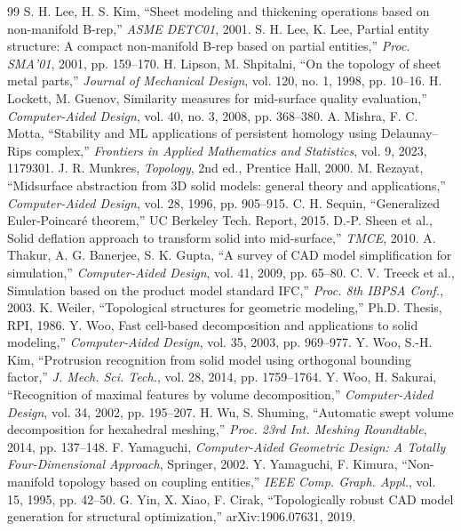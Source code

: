 \documentclass[conference]{IEEEtran}
\begin{document}
\begin{thebibliography}{99}
 S. H. Lee, H. S. Kim, ``Sheet modeling and thickening operations based on non-manifold B-rep,'' \textit{ASME DETC01}, 2001.  S. H. Lee, K. Lee, Partial entity structure: A compact non-manifold B-rep based on partial entities,'' \textit{Proc. SMA'01}, 2001, pp. 159–170.
 H. Lipson, M. Shpitalni, ``On the topology of sheet metal parts,'' \textit{Journal of Mechanical Design}, vol. 120, no. 1, 1998, pp. 10–16.  H. Lockett, M. Guenov, Similarity measures for mid-surface quality evaluation,'' \textit{Computer-Aided Design}, vol. 40, no. 3, 2008, pp. 368–380.
 A. Mishra, F. C. Motta, ``Stability and ML applications of persistent homology using Delaunay–Rips complex,'' \textit{Frontiers in Applied Mathematics and Statistics}, vol. 9, 2023, 1179301.  J. R. Munkres, \textit{Topology}, 2nd ed., Prentice Hall, 2000.  M. Rezayat, ``Midsurface abstraction from 3D solid models: general theory and applications,'' \textit{Computer-Aided Design}, vol. 28, 1996, pp. 905–915.
 C. H. Sequin, ``Generalized Euler-Poincaré theorem,'' UC Berkeley Tech. Report, 2015.  D.-P. Sheen et al., Solid deflation approach to transform solid into mid-surface,'' \textit{TMCE}, 2010.
 A. Thakur, A. G. Banerjee, S. K. Gupta, ``A survey of CAD model simplification for simulation,'' \textit{Computer-Aided Design}, vol. 41, 2009, pp. 65–80.  C. V. Treeck et al., Simulation based on the product model standard IFC,'' \textit{Proc. 8th IBPSA Conf.}, 2003.
 K. Weiler, ``Topological structures for geometric modeling,'' Ph.D. Thesis, RPI, 1986.  Y. Woo, Fast cell-based decomposition and applications to solid modeling,'' \textit{Computer-Aided Design}, vol. 35, 2003, pp. 969–977.
 Y. Woo, S.-H. Kim, ``Protrusion recognition from solid model using orthogonal bounding factor,'' \textit{J. Mech. Sci. Tech.}, vol. 28, 2014, pp. 1759–1764.  Y. Woo, H. Sakurai, ``Recognition of maximal features by volume decomposition,'' \textit{Computer-Aided Design}, vol. 34, 2002, pp. 195–207.
 H. Wu, S. Shuming, ``Automatic swept volume decomposition for hexahedral meshing,'' \textit{Proc. 23rd Int. Meshing Roundtable}, 2014, pp. 137–148.  F. Yamaguchi, \textit{Computer-Aided Geometric Design: A Totally Four-Dimensional Approach}, Springer, 2002.  Y. Yamaguchi, F. Kimura, ``Non-manifold topology based on coupling entities,'' \textit{IEEE Comp. Graph. Appl.}, vol. 15, 1995, pp. 42–50.
 G. Yin, X. Xiao, F. Cirak, ``Topologically robust CAD model generation for structural optimization,'' arXiv:1906.07631, 2019.
\end{thebibliography} 
\end{document}
